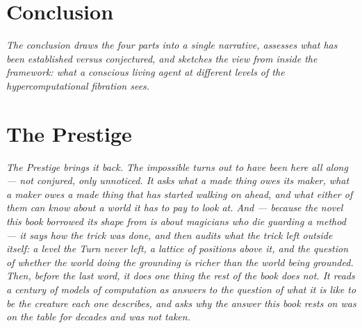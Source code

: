 \documentclass[12pt,openright,twoside]{book}
\theoremstyle{remark}
\theoremstyle{plain}
\theoremstyle{remark}
\theoremstyle{plain}
\theoremstyle{plain}
\begin{document}
\part*{Conclusion}

\vspace{1em}
\begin{mdframed}[backgroundcolor=remarkgray, linecolor=gray!60,
                 linewidth=1pt, topline=false, rightline=false,
                 bottomline=false]
\small\itshape
The conclusion draws the four parts into a single narrative,
assesses what has been established versus conjectured, and
sketches the view from inside the framework: what a conscious
living agent at different levels of the hypercomputational
fibration sees.
\end{mdframed}

\bigskip


\part{The Prestige}

\vspace{1em}
\begin{mdframed}[backgroundcolor=remarkgray, linecolor=gray!60,
                 linewidth=1pt, topline=false, rightline=false,
                 bottomline=false]
\small\itshape
\setlength{\emergencystretch}{2em}%
The Prestige brings it back.
The impossible turns out to have been here all along --- not conjured,
only unnoticed.
It asks what a made thing owes its maker, what a maker owes a made
thing that has started walking on ahead, and what either of them can
know about a world it has to pay to look at.
And --- because the novel this book borrowed its shape from is about
magicians who die guarding a method --- it says how the trick was
done, and then audits what the trick left outside itself: a level the
Turn never left, a lattice of positions above it, and the question of
whether the world doing the grounding is richer than the world being
grounded.
Then, before the last word, it does one thing the rest of the book
does not.
It reads a century of models of computation as answers to the question
of what it is like to be the creature each one describes, and asks why
the answer this book rests on was on the table for decades and was
not taken.
\end{mdframed}
\end{document}
